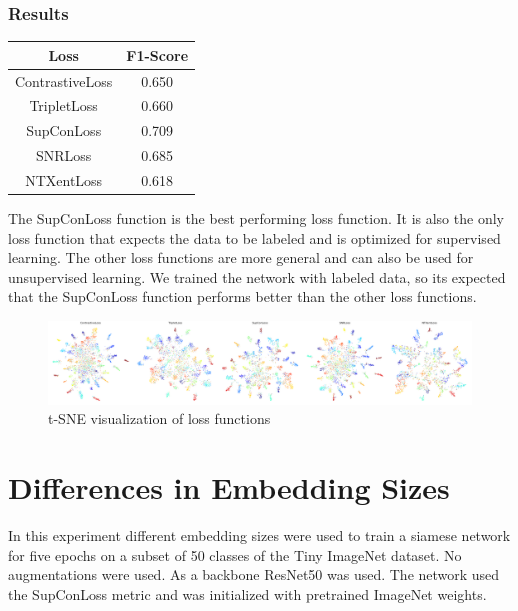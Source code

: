 \documentclass[12pt,a4paper]{report}
\begin{document}
\subsubsection*{Results}
\begin{table}
	\begin{tabular}{ | c | c | }
		\hline
		Loss & F1-Score \\ 
		\hline
		ContrastiveLoss & 0.650 \\ 
		\hline
		TripletLoss & 0.660 \\ 
		\hline
		SupConLoss & 0.709 \\ 
		\hline
		SNRLoss & 0.685 \\ 
		\hline
		NTXentLoss & 0.618 \\ 
		\hline
	\end{tabular}
\end{table} 

The SupConLoss function is the best performing loss function.
It is also the only loss function that expects the data to be labeled and is optimized for supervised learning.
The other loss functions are more general and can also be used for unsupervised learning.
We trained the network with labeled data, so its expected that the SupConLoss function performs better than the other loss functions.

\begin{figure}[h]
	\centering
	\includegraphics[width=\textwidth]{../plots/losses.png}
	\caption{t-SNE visualization of loss functions}
\end{figure}

\newpage

\section{Differences in Embedding Sizes}

In this experiment different embedding sizes were used to train a siamese network for five epochs on a subset of 50 classes of the Tiny ImageNet dataset.
No augmentations were used.
As a backbone ResNet50 was used.
The network used the SupConLoss metric and was initialized with pretrained ImageNet weights.
\end{document}
